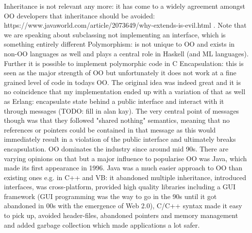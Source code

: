 Inheritance is not relevant any more: it has come to a widely agreement amongst OO developers that inheritance should be avoided: https://www.javaworld.com/article/2073649/why-extends-is-evil.html . Note that we are speaking about subclassing not implementing an interface, which is something entirely different
Polymorphism: is not unique to OO and exists in non-OO languages as well and plays a central role in Haskell (and ML languages). Further it is possible to implement polymorphic code in C
Encapsulation: this is seen as the major strength of OO but unfortunately it does not work at a fine grained level of code in todays OO. The original idea was indeed great and it is no coincidence that my implementation ended up with a variation of that as well as Erlang: encapsulate state behind a public interface and interact with it through messages (TODO: fill in alan kay). The very central point of messages though was that they followed "shared nothing" semantics, meaning that no references or pointers could be contained in that message as this would immediately result in a violation of the public interface and ultimately breaks encapsulation. 
OO dominates the industry since around mid 90s. There are varying opinions on that but a major influence to popularise OO was Java, which made its first appearance in 1996. Java was a much easier approach to OO than existing ones e.g. in C++ and VB: it abandoned multiple inheritance, introduced interfaces, was cross-platform, provided high quality libraries including a GUI framework (GUI programming was the way to go in the 90s until it got abandoned in 00s with the emergence of Web 2.0), C/C++ syntax made it easy to pick up, avoided header-files, abandoned pointers and memory management and added garbage collection which made applications a lot safer.


